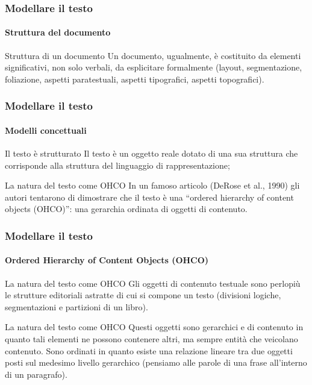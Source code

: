 \begin{frame}
	\frametitle{Modellare il testo}
	\framesubtitle{Struttura del documento}
	\addtocounter{nframe}{1}

	\begin{block}{Struttura di un documento}
		Un documento, ugualmente, è costituito da elementi significativi, non solo verbali, da esplicitare formalmente (layout, segmentazione, foliazione, aspetti paratestuali, aspetti tipografici, aspetti topografici).
	\end{block}

\end{frame}




\begin{frame}
	\frametitle{Modellare il testo}
	\framesubtitle{Modelli concettuali}
	\addtocounter{nframe}{1}

	\begin{block}{Il testo è strutturato}
		Il testo è un oggetto reale dotato di una sua struttura che corrisponde alla struttura del linguaggio di rappresentazione;
	\end{block}

	\begin{block}{La natura del testo come OHCO}
		In un famoso articolo (DeRose et al., 1990) gli autori tentarono di dimostrare che il testo è una ``ordered hierarchy of content objects (OHCO)'': una gerarchia ordinata di oggetti di contenuto.
	\end{block}
\end{frame}


\begin{frame}
	\frametitle{Modellare il testo}
	\framesubtitle{Ordered Hierarchy of Content Objects (OHCO)}
	\addtocounter{nframe}{1}

	\begin{block}{La natura del testo come OHCO}
		Gli oggetti di contenuto testuale sono perlopiù le strutture editoriali astratte di cui si compone un testo (divisioni logiche, segmentazioni e partizioni di un libro).
	\end{block}

	\begin{block}{La natura del testo come OHCO}
		Questi oggetti sono gerarchici e di contenuto in quanto tali elementi ne possono contenere altri, ma sempre entità che veicolano contenuto.  Sono ordinati in quanto esiste una relazione lineare tra due oggetti posti sul medesimo livello gerarchico (pensiamo alle parole di una frase all'interno di un paragrafo).
	\end{block}
\end{frame}

